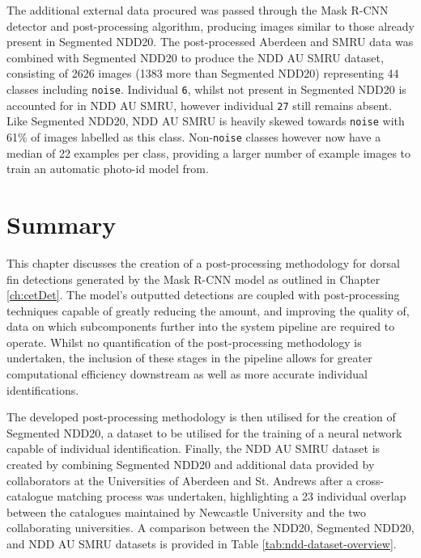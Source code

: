 The additional external data procured was passed through the Mask R-CNN detector and post-processing algorithm, producing images similar to those already present in Segmented NDD20. The post-processed Aberdeen and SMRU data was combined with Segmented NDD20 to produce the NDD AU SMRU dataset, consisting of 2626 images (1383 more than Segmented NDD20) representing 44 classes including \texttt{noise}. Individual \texttt{6}, whilst not present in Segmented NDD20 is accounted for in NDD AU SMRU, however individual \texttt{27} still remains absent. Like Segmented NDD20, NDD AU SMRU is heavily skewed towards \texttt{noise} with 61\% of images labelled as this class. Non-\texttt{noise} classes however now have a median of 22 examples per class, providing a larger number of example images to train an automatic photo-id model from. 

\section{Summary}\label{ch:postProcessing,sec:summary}

This chapter discusses the creation of a post-processing methodology for dorsal fin detections generated by the Mask R-CNN model as outlined in Chapter \ref{ch:cetDet}. The model's outputted detections are coupled with post-processing techniques capable of greatly reducing the amount, and improving the quality of, data on which subcomponents further into the system pipeline are required to operate. Whilst no quantification of the post-processing methodology is undertaken, the inclusion of these stages in the pipeline allows for greater computational efficiency downstream as well as more accurate individual identifications. 

The developed post-processing methodology is then utilised for the creation of Segmented NDD20, a dataset to be utilised for the training of a neural network capable of individual identification. Finally, the NDD AU SMRU dataset is created by combining Segmented NDD20 and additional data provided by collaborators at the Universities of Aberdeen and St. Andrews after a cross-catalogue matching process was undertaken, highlighting a 23 individual overlap between the catalogues maintained by Newcastle University and the two collaborating universities. A comparison between the NDD20, Segmented NDD20, and NDD AU SMRU datasets is provided in Table \ref{tab:ndd-dataset-overview}.

